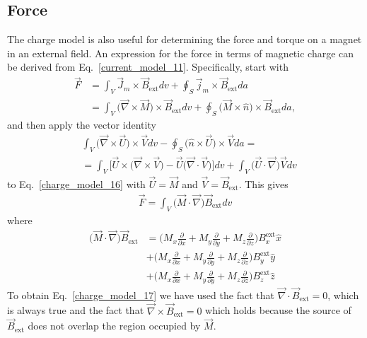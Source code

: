 \documentclass[11pt,a4paper,oneside]{book}
\numberwithin{equation}{section}
\theoremstyle{it}
\theoremstyle{definition}
\begin{document}
\subsection{Force}
The charge model is also useful for determining the force and torque on a magnet in an external field. An expression for the force in terms of magnetic charge can be derived from Eq.~\eqref{current_model_11}. Specifically, start with 
\begin{equation}\label{charge_model_16}
	\begin{aligned}
		\vec{F} &= \int_{V} \vec{J}_m\times\vec{B}_{\text{ext}}dv+\oint_{S}\vec{j}_m\times\vec{B}_{\text{ext}}da \\[6pt]
		&= \int_{V}\Big(\vec{\nabla}\times\vec{M}\Big)\times\vec{B}_{\text{ext}}dv+\oint_{S}\Big(\vec{M}\times\hat{n}\Big)\times\vec{B}_{\text{ext}}da,
	\end{aligned}
\end{equation} 
and then apply the vector identity
\begin{equation*}\label{}
	\begin{aligned}
&\int_{V}\Big(\vec{\nabla}\times\vec{U}\Big)\times\vec{V}dv - \oint_{S}\Big(\hat{n}\times\vec{U}\Big)\times\vec{V}da = \\[6pt]
&=\int_{V}\Big[\vec{U}\times\Big(\vec{\nabla}\times\vec{V}\Big)-\vec{U}\Big(\vec{\nabla}\cdot\vec{V}\Big)\Big]dv + \int_{V}\Big(\vec{U}\cdot\vec{\nabla}\Big)\vec{V}dv		
	\end{aligned}
\end{equation*} 
to Eq.~\eqref{charge_model_16} with $\vec{U}=\vec{M}$ and $\vec{V}=\vec{B}_{\text{ext}}$.  This gives
\begin{equation}\label{charge_model_17}
	\begin{aligned}
		\vec{F} = \int_{V}\Big(\vec{M}\cdot\vec{\nabla}\Big)\vec{B}_{\text{ext}}dv
	\end{aligned}
\end{equation} 
where
\begin{equation*}\label{}
	\begin{aligned}
		\Big(\vec{M}\cdot\vec{\nabla}\Big)\vec{B}_{\text{ext}} &= \Biggl(M_x\frac{\partial}{\partial x}+M_y\frac{\partial}{\partial y}+M_z\frac{\partial}{\partial z}\Biggr)B^{\text{ext}}_x\hat{x} \\[6pt]
		&+\Biggl(M_x\frac{\partial}{\partial x}+M_y\frac{\partial}{\partial y}+M_z\frac{\partial}{\partial z}\Biggr)B^{\text{ext}}_y\hat{y} \\[6pt]
		&+\Biggl(M_x\frac{\partial}{\partial x}+M_y\frac{\partial}{\partial y}+M_z\frac{\partial}{\partial z}\Biggr)B^{\text{ext}}_z\hat{z}
	\end{aligned}
\end{equation*} 
To obtain Eq.~\eqref{charge_model_17} we have used the fact that $\vec{\nabla}\cdot\vec{B}_{\text{ext}}=0$, which is always true and the fact that $\vec{\nabla}\times\vec{B}_\text{ext}=0$ which holds because the source of $\vec{B}_\text{ext}$ does not overlap the region occupied by $\vec{M}$. 
\end{document}
